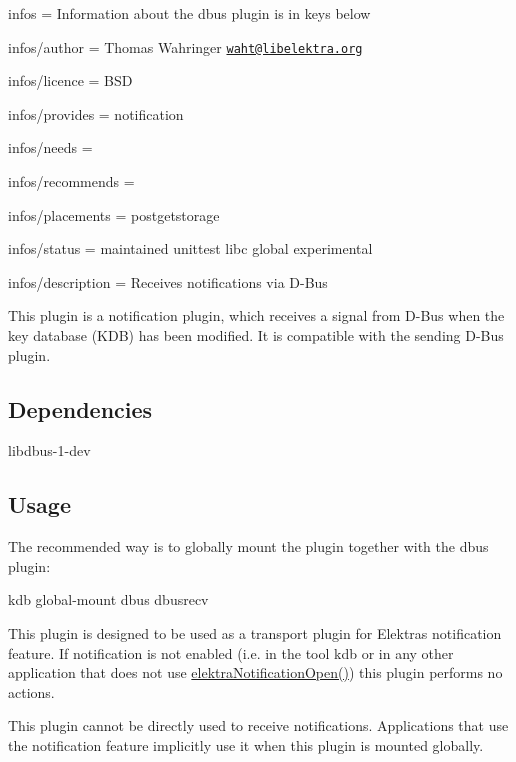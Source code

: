 
\begin{DoxyItemize}
\item infos = Information about the dbus plugin is in keys below
\item infos/author = Thomas Wahringer \href{mailto:waht@libelektra.org}{\tt waht@libelektra.\+org}
\item infos/licence = B\+SD
\item infos/provides = notification
\item infos/needs =
\item infos/recommends =
\item infos/placements = postgetstorage
\item infos/status = maintained unittest libc global experimental
\item infos/description = Receives notifications via D-\/\+Bus
\end{DoxyItemize}

This plugin is a notification plugin, which receives a signal from D-\/\+Bus when the key database (K\+DB) has been modified. It is compatible with the sending D-\/\+Bus plugin.

\subsection*{Dependencies}


\begin{DoxyItemize}
\item {\ttfamily libdbus-\/1-\/dev}
\end{DoxyItemize}

\subsection*{Usage}

The recommended way is to globally mount the plugin together with the dbus plugin\+: \begin{DoxyVerb}    kdb global-mount dbus dbusrecv
\end{DoxyVerb}


This plugin is designed to be used as a transport plugin for Elektra\textquotesingle{}s notification feature. If notification is not enabled (i.\+e. in the tool {\ttfamily kdb} or in any other application that does not use {\ttfamily \hyperlink{notification_8c_aeae96154abdb5fdbf1b34a01e2b23e44}{elektra\+Notification\+Open()}}) this plugin performs no actions.

This plugin cannot be directly used to receive notifications. Applications that use the notification feature implicitly use it when this plugin is mounted globally.

